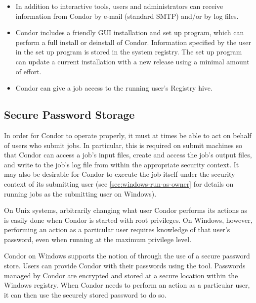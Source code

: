 \begin{itemize}
\item In addition to interactive tools, users and administrators can receive
information from Condor by e-mail (standard SMTP) and/or by log files.

\item Condor includes a friendly GUI installation and set up program,
which can perform a full install or deinstall of Condor.
Information specified by the user in the set up program is stored in the
system registry.  
The set up program can update a current installation with a
new release using a minimal amount of effort.

\item Condor can give a job access to the running user's Registry hive.

\end{itemize}

\subsection{\label{sec:windows-sps}Secure Password Storage}

In order for Condor to operate properly, it must at times be able to
act on behalf of users who submit jobs.  In particular, this is
required on submit machines so that Condor can access a job's input
files, create and access the job's output files, and write to the
job's log file from within the appropriate security context.  It may
also be desirable for Condor to execute the job itself under the
security context of its submitting user (see
\ref{sec:windows-run-as-owner} for details on running jobs as the
submitting user on Windows).

On Unix systems, arbitrarily changing what user Condor performs its
actions as is easily done when Condor is started with root privileges.
On Windows, however, performing an action as a particular user
requires knowledge of that user's password, even when running at the
maximum privilege level.

Condor on Windows supports the notion of 
through the use of a secure password store.  Users can provide Condor
with their passwords using the  tool.  Passwords
managed by Condor are encrypted and stored at a secure location within the
Windows registry.  When Condor needs to perform an action as a
particular user, it can then use the securely stored password to do
so.

